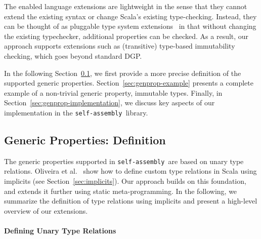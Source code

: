 \documentclass[preprint]{sigplanconf}
\newcommand{\selfassembly}{\texttt{self-assembly~}}
\begin{document}
The enabled language extensions are lightweight in the sense that they cannot
extend the existing syntax or change Scala’s existing type-checking. Instead,
they can be thought of as pluggable type system
extensions~\cite{PluggableTypes} in that without changing the existing
typechecker, additional properties can be checked. As a result, our approach
supports extensions such as (transitive) type-based immutability checking,
which goes beyond standard DGP.



In the following Section~\ref{sec:genprop-definition}, we first provide a more
precise definition of the supported generic properties.
Section~\ref{sec:genprop-example} presents a complete example of a non-trivial generic
property, immutable types. Finally, in Section~\ref{sec:genprop-implementation}, we discuss
key aspects of our implementation in the \selfassembly library.



\subsection{Generic Properties: Definition}\label{sec:genprop-definition}

The generic properties supported in \selfassembly are based on unary type
relations. Oliveira et al.~\cite{Oliveira2010} show how to define custom type
relations in Scala using implicits (see Section~\ref{sec:implicits}). Our
approach builds on this foundation, and extends it further using static
meta-programming. In the following, we summarize the definition of type relations
using implicits and present a high-level overview of our extensions.

\paragraph{Defining Unary Type Relations}
\end{document}
